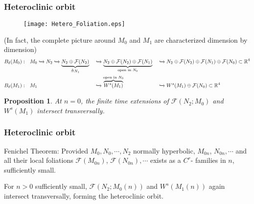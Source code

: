 \documentclass{beamer}
\def\blue{\color{blue}}
\newtheorem{proposition}{Proposition}
\begin{document}
\begin{frame}
\frametitle{Heteroclinic orbit}
 \begin{figure}
  \texttt{[image: Hetero\_Foliation.eps]}
 \end{figure}
{ \tiny
(In fact, the complete picture around $M_0$ and $M_1$ are characterized dimension by dimension)
\begin{align*}
 B_\delta(M_0): ~~ M_0&\xhookrightarrow{} N_2\xhookrightarrow{} \underbrace{N_2\oplus \mathcal{F}(N_2)}_{\triangleq N_1} &&\xhookrightarrow{} \underbrace{N_2\oplus \mathcal{F}(N_2)\oplus \mathcal{F}(N_1)}_{\text{open in } N_0} &&\xhookrightarrow{} N_2\oplus \mathcal{F}(N_2)\oplus \mathcal{F}(N_1) \oplus \mathcal{F}(N_0)\subset \mathbb{R}^4\\
 B_\delta(M_1): ~~ M_1& & &\xhookrightarrow{} \overbrace{W^s(M_1)}^{\text{open in } N_0}&&\xhookrightarrow{} W^s(M_1)\oplus \mathcal{F}(N_0)\subset \mathbb{R}^4
\end{align*}
}

\begin{proposition}
 At $n=0$, the finite time extensions of $\mathcal{F}(N_2;M_0)$ and $W^{s}(M_1)$ intersect transversally.
\end{proposition} 
 
\end{frame}


\begin{frame}
 \frametitle{Heteroclinic orbit}
{\scriptsize 
 Fenichel Theorem: Provided $M_0, N_0, \cdots , N_2$ {\blue normally hyperbolic}, $M_{0n}$, $N_{0n}, \cdots$ and all their local foliations $\mathcal{F}(M_{0n})$, $\mathcal{F}(N_{0n}), \cdots$ {\blue exists} as a $C^r$- families in $n$, sufficiently small.
} 

\begin{corollary}
 For $n>0$ sufficiently small, $\mathcal{F}(N_2;M_0(n))$ and $W^{s}(M_1(n))$ again intersect transversally, forming the heteroclinic orbit.
\end{corollary}

\end{frame}
\end{document}
